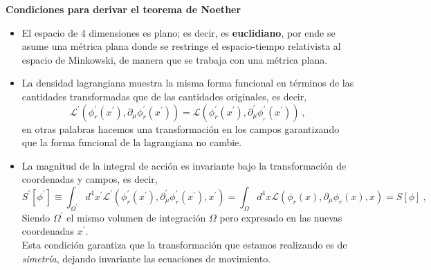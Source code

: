 \vspace{1cm}
\begin{definition}
\label{definoether}
\textbf{Condiciones para derivar el teorema de Noether}
\begin{itemize}
\item[1.]  El espacio de 4 dimensiones es plano; es decir, es \textbf{euclidiano}, por ende se asume una m\'{e}trica plana donde se restringe el espacio-tiempo relativista al espacio de Minkowski, de manera que se trabaja con una m\'{e}trica plana.\\

\item[2.] La densidad lagrangiana muestra la misma forma funcional en t\'{e}rminos
de las cantidades transformadas que de las cantidades originales, es decir,%
\begin{equation}
\mathcal{L}^{\prime }\left( \phi _{r}^{\prime }\left( x^{\prime }\right)
,\partial _{\mu }\phi _{r}^{\prime }\left( x^{\prime }\right) \right) =
\mathcal{L}\left( \phi _{r}^{\prime }\left( x^{\prime }\right) ,\partial^{\prime}
_{\mu }\phi _{_{r}}^{\prime }\left( x^{\prime }\right) \right) ~,
\label{2.40}
\end{equation}
en otras palabras hacemos una transformaci\'{o}n en los campos garantizando que la forma funcional de la lagrangiana no cambie.\\

\item[3.] La magnitud de la integral de acci\'{o}n es invariante bajo la transformaci\'{o}n de coordenadas y campos, es decir,
\begin{equation}
S^{\prime }[\phi^{\prime}]\equiv \int_{\Omega ^{\prime }}d^{4}x^{\prime} \mathcal{L}^{\prime }\left(\phi _{r}^{\prime }\left( x^{\prime}\right),\partial^{\prime}_{\mu }\phi_{r}^{\prime }\left( x^{\prime }\right) ,x^{\prime }\right) =\int_{\Omega }d^{4}x \mathcal{L}\left( \phi_{r}\left( x\right) ,\partial _{\mu }\phi _{r}\left( x \right),x\right)=S[\phi] ~,  \label{2.41}
\end{equation}
Siendo $\Omega^{\prime}$ el mismo volumen de integración $\Omega$ pero expresado en las nuevas coordenadas $x^{\prime}$.\\

Esta condición garantiza que la transformación que estamos realizando es de \emph{simetría}, dejando invariante las ecuaciones de movimiento. 
\end{itemize}
\label{defiN}
\end{definition}

